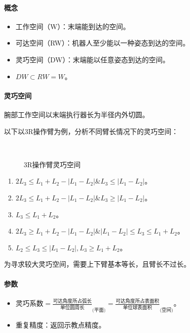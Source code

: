 \documentclass[
12pt, %
a4paper, 
oneside, %
headinclude,footinclude, %
]{scrartcl}
\begin{document}
\paragraph{概念}
\begin{itemize}
\item 工作空间（W）：末端能到达的空间。
\item 可达空间（RW）：机器人至少能以一种姿态到达的空间。
\item 灵巧空间（DW）：末端能以任意姿态到达的空间。
\item $ DW \subset RW = W $。
\end{itemize} 
\paragraph{灵巧空间}
腕部工作空间以末端执行器长为半径内外切圆。

以下以3R操作臂为例，分析不同臂长情况下的灵巧空间：
\begin{figure}[H]
\centering
{} \quad
{} \quad
{} \\
 \quad
{}
\caption[3R操作臂灵巧空间]{3R操作臂灵巧空间}
\end{figure}

{\footnotesize
\begin{enumerate}
\item $ 2L_3 \leq L_1 + L_2 - |L_1 - L_2|\&L_3 \leq |L_1 - L_2| $。
\item $ 2L_3 \leq L_1 + L_2 - |L_1 - L_2|\&L_3 \geq |L_1 - L_2| $。
\item $ L_3 \leq L_1 + L_2 $。
\item $ 2L_3 \geq L_1 + L_2 - |L_1 - L_2|\&|L_1 - L_2| \leq L_3 \leq L_1 + L_2 $。
\item $ L_2 \leq L_3 \leq |L_1 - L_2|, L_3 \geq L_1 + L_2 $。
\end{enumerate}
}

为寻求较大灵巧空间，需要上下臂基本等长，且臂长不过长。
\paragraph{参数}
\begin{itemize}
\item $ \text{灵巧系数} = \frac{\text{可达角度所占弧长}}{\text{单位圆周长}}_{\text{(平面)}} = \frac{\text{可达角度所占表面积}}{\text{单位球表面积}}_{\text{(空间)}} $。
\item 重复精度：返回示教点精度。
\end{itemize} 
\end{document}
